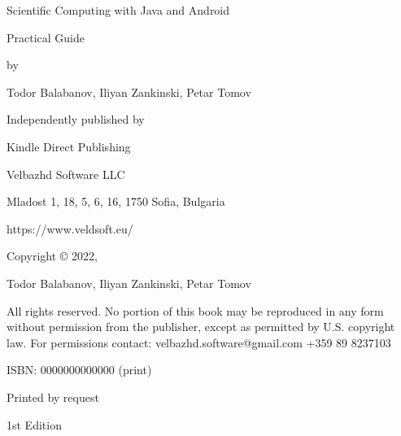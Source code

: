 \newpage

Scientific Computing with Java and Android

Practical Guide

by

Todor Balabanov, Iliyan Zankinski, Petar Tomov

\vspace{0.4cm}

Independently published by

Kindle Direct Publishing

\vspace{0.4cm}

Velbazhd Software LLC

Mladost 1, 18, 5, 6, 16, 1750 Sofia, Bulgaria

\vspace{0.4cm}

https://www.veldsoft.eu/

\vspace{0.4cm}

Copyright © 2022,

Todor Balabanov, Iliyan Zankinski, Petar Tomov

\vspace{0.4cm}

All rights reserved. No portion of this book may be reproduced in any form without permission from the publisher, except as permitted by U.S. copyright law. For permissions contact: velbazhd.software@gmail.com +359 89 8237103

\vspace{0.4cm}

ISBN: 0000000000000 (print)

Printed by request

1st Edition
